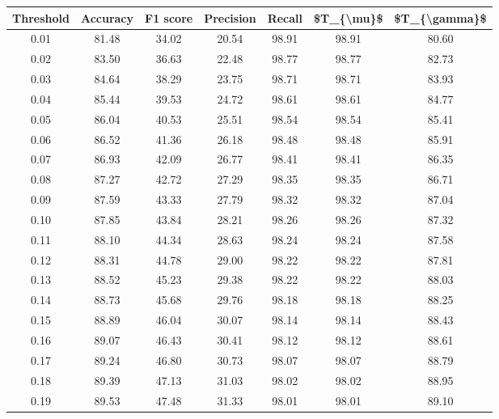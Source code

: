 \begin{tabular}{|c|c|c|c|c|c|c|}
\hline
 Threshold &  Accuracy &  F1 score &  Precision &  Recall &  \$T\_\{\textbackslash mu\}\$ &  \$T\_\{\textbackslash gamma\}\$ \\
\hline
      0.01 &     81.48 &     34.02 &      20.54 &   98.91 &      98.91 &         80.60 \\
      0.02 &     83.50 &     36.63 &      22.48 &   98.77 &      98.77 &         82.73 \\
      0.03 &     84.64 &     38.29 &      23.75 &   98.71 &      98.71 &         83.93 \\
      0.04 &     85.44 &     39.53 &      24.72 &   98.61 &      98.61 &         84.77 \\
      0.05 &     86.04 &     40.53 &      25.51 &   98.54 &      98.54 &         85.41 \\
      0.06 &     86.52 &     41.36 &      26.18 &   98.48 &      98.48 &         85.91 \\
      0.07 &     86.93 &     42.09 &      26.77 &   98.41 &      98.41 &         86.35 \\
      0.08 &     87.27 &     42.72 &      27.29 &   98.35 &      98.35 &         86.71 \\
      0.09 &     87.59 &     43.33 &      27.79 &   98.32 &      98.32 &         87.04 \\
      0.10 &     87.85 &     43.84 &      28.21 &   98.26 &      98.26 &         87.32 \\
      0.11 &     88.10 &     44.34 &      28.63 &   98.24 &      98.24 &         87.58 \\
      0.12 &     88.31 &     44.78 &      29.00 &   98.22 &      98.22 &         87.81 \\
      0.13 &     88.52 &     45.23 &      29.38 &   98.22 &      98.22 &         88.03 \\
      0.14 &     88.73 &     45.68 &      29.76 &   98.18 &      98.18 &         88.25 \\
      0.15 &     88.89 &     46.04 &      30.07 &   98.14 &      98.14 &         88.43 \\
      0.16 &     89.07 &     46.43 &      30.41 &   98.12 &      98.12 &         88.61 \\
      0.17 &     89.24 &     46.80 &      30.73 &   98.07 &      98.07 &         88.79 \\
      0.18 &     89.39 &     47.13 &      31.03 &   98.02 &      98.02 &         88.95 \\
      0.19 &     89.53 &     47.48 &      31.33 &   98.01 &      98.01 &         89.10 \\

\end{tabular}
